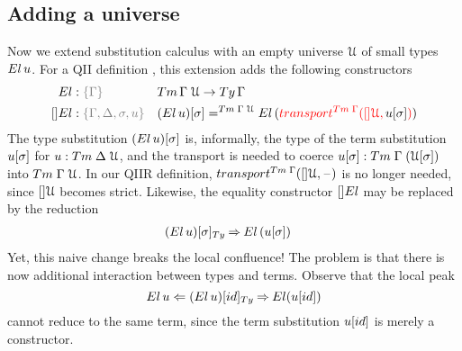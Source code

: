 \documentclass[a4paper,UKenglish,numberwithinsect,cleveref,thm-restate]{lipics-v2021}
\begin{document}
\subsection{Adding a universe} \label{subsec:SC+U}
Now we extend substitution calculus with an empty universe $\mathcal{U}$ of small types~$\El\,u$.
For a QII definition \cite{Altenkirch2016a}, this extension adds the following constructors
\begin{alignat*}{3}
  \El   & : \implicit{\Gamma} && \Tm\,\Gamma\;\UU \to \Ty\,\Gamma \\
  []\El & : \implicit{\Gamma, \Delta, \sigma, u} && \sub{(\El\, u)}{\sigma} =^{\Tm\;\Gamma\;\UU} \El\,(\alert{\transfib{\Tm\;\Gamma}{[]\UU}{\color{black}\sub{u}{\sigma}}})
\end{alignat*}
The type substitution $\sub{(\El\,u)}{\sigma}$ is, informally, the type of the term substitution ${{u}[ \sigma ]}$ for $u : \Tm\;\Delta\;\UU$, and the transport is needed to coerce $\sub{u}{\sigma} : \Tm\;\Gamma\;(\sub{\UU}{\sigma})$ into $\Tm\;\Gamma\;\UU$.
%
In our QIIR definition, $\transfib{\Tm\;\Gamma}{[]\UU}{\blank}$ is no longer needed, since $[]\mathcal{U}$ becomes strict. 
Likewise, the equality constructor $[]\El$ may be replaced by the reduction
\begin{alignat*}{3}
  \subTy{(\El\, u)}{\sigma} & \reduce \El\,(\sub{u}{\sigma})
\end{alignat*}
Yet, this naive change breaks the local confluence!
The problem is that there is now additional interaction between types and terms. Observe that the local peak
\[
  \El\,u \Leftarrow \subTy{(\El\,u)}{\idS} \reduce \El(\sub{u}{\idS})
\]
cannot reduce to the same term, since the term substitution $\sub{u}{\idS}$ is merely a constructor.
\end{document}
